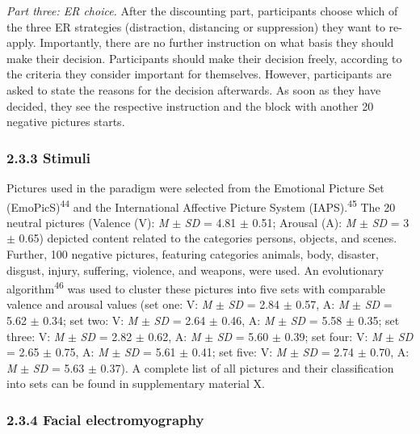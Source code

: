 \documentclass[
  english,
  man,floatsintext]{apa6}
\begin{document}
\emph{Part three: ER choice.} After the discounting part, participants choose which of the three ER strategies (distraction, distancing or suppression) they want to re-apply.
Importantly, there are no further instruction on what basis they should make their decision.
Participants should make their decision freely, according to the criteria they consider important for themselves.
However, participants are asked to state the reasons for the decision afterwards.
As soon as they have decided, they see the respective instruction and the block with another 20 negative pictures starts.

\hypertarget{stimuli}{%
\subsubsection{2.3.3 Stimuli}\label{stimuli}}

Pictures used in the paradigm were selected from the Emotional Picture Set (EmoPicS)\textsuperscript{44} and the International Affective Picture System (IAPS).\textsuperscript{45}
The 20 neutral pictures (Valence (V): \emph{M} \(\pm\) \emph{SD} = 4.81 \(\pm\) 0.51; Arousal (A): \emph{M} \(\pm\) \emph{SD} = 3 \(\pm\) 0.65) depicted content related to the categories persons, objects, and scenes.
Further, 100 negative pictures, featuring categories animals, body, disaster, disgust, injury, suffering, violence, and weapons, were used.
An evolutionary algorithm\textsuperscript{46} was used to cluster these pictures into five sets with comparable valence and arousal values (set one: V: \emph{M} \(\pm\) \emph{SD} = 2.84 \(\pm\) 0.57, A: \emph{M} \(\pm\) \emph{SD} = 5.62 \(\pm\) 0.34; set two: V: \emph{M} \(\pm\) \emph{SD} = 2.64 \(\pm\) 0.46, A: \emph{M} \(\pm\) \emph{SD} = 5.58 \(\pm\) 0.35; set three: V: \emph{M} \(\pm\) \emph{SD} = 2.82 \(\pm\) 0.62, A: \emph{M} \(\pm\) \emph{SD} = 5.60 \(\pm\) 0.39; set four: V: \emph{M} \(\pm\) \emph{SD} = 2.65 \(\pm\) 0.75, A: \emph{M} \(\pm\) \emph{SD} = 5.61 \(\pm\) 0.41; set five: V: \emph{M} \(\pm\) \emph{SD} = 2.74 \(\pm\) 0.70, A: \emph{M} \(\pm\) \emph{SD} = 5.63 \(\pm\) 0.37).
A complete list of all pictures and their classification into sets can be found in supplementary material X.

\hypertarget{facial-electromyography}{%
\subsubsection{2.3.4 Facial electromyography}\label{facial-electromyography}}
\end{document}
